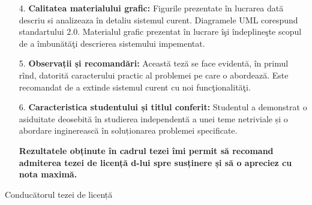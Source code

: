\begin{titlepage}
\begin{flushleft}
\begin{enumerate}[leftmargin=1.4em, itemsep=1pt, parsep=0pt]
        \item [4.] \textbf{Calitatea materialului grafic:} Figurile prezentate în lucrarea dată descriu si analizeaza în detaliu sistemul curent. Diagramele UML corespund standartului 2.0. Materialul grafic prezentat în lucrare îşi îndeplineşte scopul de a îmbunătăţi descrierea sistemului impementat.
        
        \item [5.] \textbf{Observații și recomandări:} Această teză se face evidentă, în primul rînd, datorită caracterului practic al problemei pe care o abordează. Este recomandat de a extinde sistemul curent cu noi funcţionalităţi.
        
        \item [6.] \textbf{Caracteristica studentului și titlul conferit:} Studentul a demonstrat o asiduitate deosebită în studierea independentă a unei teme netriviale și o abordare inginerească în soluționarea problemei specificate.
        
        \textbf{Rezultatele obținute în cadrul tezei îmi permit să recomand admiterea tezei de licență d-lui \MyName spre susținere și să o apreciez cu nota maximă.}
        
        \end{enumerate}
        
        \hfill Conducătorul tezei de licență\\
        \hfill \textbf{\Coordonator}\\

    \end{flushleft}
    \vfill
\end{titlepage}
